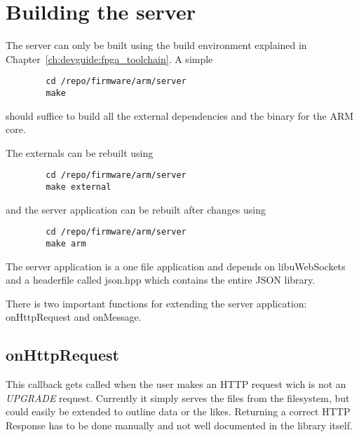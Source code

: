 \section{Building the server}
\label{sec:devguide:server:build}

The  server  can only  be  built  using  the  build environment  explained  in
Chapter~\ref{ch:devguide:fpga_toolchain}.
A simple

\begin{listing}
    \begin{verbatim}
        cd /repo/firmware/arm/server
        make
    \end{verbatim}
\end{listing}

should suffice to build all the external dependencies and the binary for the ARM core.

The externals can be rebuilt using

\begin{listing}
    \begin{verbatim}
        cd /repo/firmware/arm/server
        make external
    \end{verbatim}
\end{listing}

and the server application can be rebuilt after changes using

\begin{listing}
    \begin{verbatim}
        cd /repo/firmware/arm/server
        make arm
    \end{verbatim}
\end{listing}

The   server  application   is  a   one  file   application  and   depends  on
libuWebSockets\cite{TODO:} and a  headerfile called json.hpp\cite{TODO:} which
contains the entire JSON library.

There  is  two  important  functions for  extending  the  server  application:
onHttpRequest and onMessage.

\subsection{onHttpRequest}

This callback gets called  when the user makes an HTTP request  wich is not an
\textit{UPGRADE}  request. Currently  it  simply  serves the  files  from  the
filesystem, but could easily be extended to outline data or the likes.
Returning  a correct  HTTP  Response has  to  be done  manually  and not  well
documented in the library itself.


